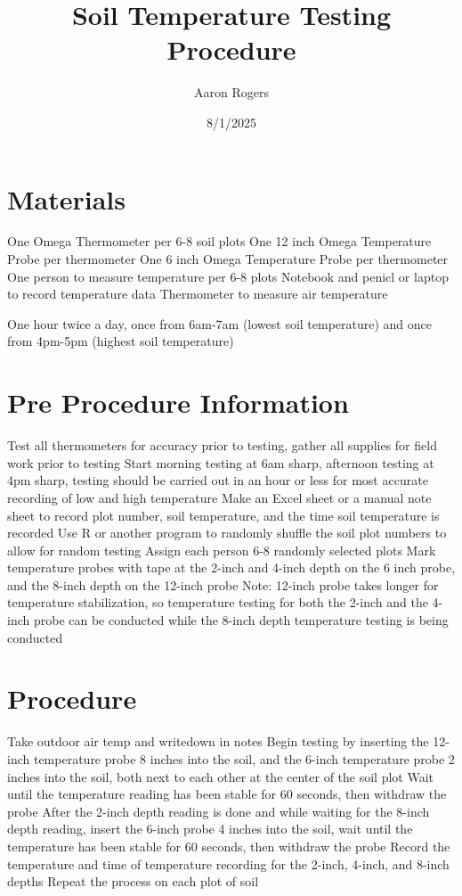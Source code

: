 \documentclass[12pt]{../SOP4_alpha}\usepackage[]{graphicx}\usepackage[]{xcolor}
\title{Soil Temperature Testing Procedure}
\date{8/1/2025}
\author{Aaron Rogers}
\begin{document}
\maketitle
\section{Materials}
\NP One Omega Thermometer per 6-8 soil plots
\NP One 12 inch Omega Temperature Probe per thermometer
\NP One 6 inch Omega Temperature Probe per thermometer
\NP One person to measure temperature per 6-8 plots 
\NP Notebook and penicl or laptop to record temperature data 
\NP Thermometer to measure air temperature


\NP One hour twice a day, once from 6am-7am (lowest soil temperature) and once from 4pm-5pm (highest soil temperature)


\section{Pre Procedure Information}
\NP Test all thermometers for accuracy prior to testing, gather all supplies for field work prior to testing
\NP Start morning testing at 6am sharp, afternoon testing at 4pm sharp, testing should be carried out in an hour or less for most accurate recording of low and high temperature
\NP Make an Excel sheet or a manual note sheet to record plot number, soil temperature, and the time soil temperature is recorded
\NP Use R or another program to randomly shuffle the soil plot numbers to allow for random testing
\NP Assign each person 6-8 randomly selected plots
\NP Mark temperature probes with tape at the 2-inch and 4-inch depth on the 6 inch probe, and the 8-inch depth on the 12-inch probe 
\NP Note: 12-inch probe takes longer for temperature stabilization, so temperature testing for both the 2-inch and the 4-inch probe can be conducted while the 8-inch depth temperature testing is being conducted  



\section{Procedure}
\NP Take outdoor air temp and writedown in notes
\NP Begin testing by inserting the 12-inch temperature probe 8 inches into the soil, and the 6-inch temperature probe 2 inches into the soil, both next to each other at the center of the soil plot
\NP Wait until the temperature reading has been stable for 60 seconds, then withdraw the probe
\NP After the 2-inch depth reading is done and while waiting for the 8-inch depth reading, insert the 6-inch probe 4 inches into the soil, wait until the temperature has been stable for 60 seconds, then withdraw the probe
\NP Record the temperature and time of temperature recording for the 2-inch, 4-inch, and 8-inch depths
\NP Repeat the process on each plot of soil
\end{document}
